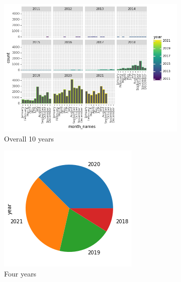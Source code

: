\begin{figure}
      \centering
	    \begin{subfigure}{0.1\linewidth}
		\includegraphics[width=\linewidth]{Overall 10 years of data.png}
		\caption{Overall 10 years}
		\label{fig: 10 year data distribution}
	   \end{subfigure}
	   \begin{subfigure}{0.1\linewidth}
		\includegraphics[width=\linewidth]{Annual trends Second Data.png}
		\caption{Four years}
		\label{fig:Four years}
	    \end{subfigure}
	   \vfill
	 \caption{}
\end{figure}

